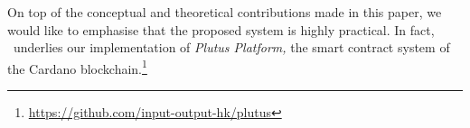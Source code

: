 On top of the conceptual and theoretical contributions made in this paper, we would like to emphasise that the proposed system is highly practical. In fact, \EUTXOma\ underlies our implementation of \emph{Plutus Platform,} the smart contract system of the Cardano blockchain.\footnote{\url{https://github.com/input-output-hk/plutus}}
